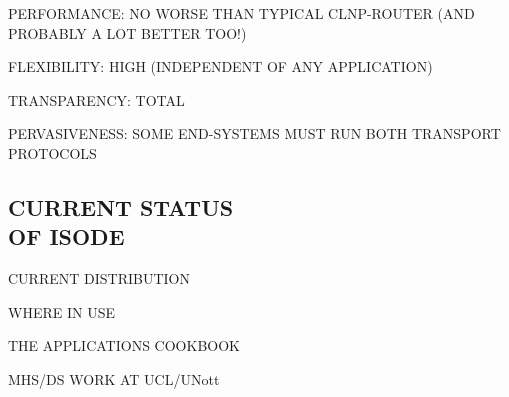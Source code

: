 

\begin{bwslide}

\begin{nrtc}
\item	PERFORMANCE: NO WORSE THAN TYPICAL CLNP-ROUTER (AND PROBABLY A LOT
	BETTER TOO!)

\item	FLEXIBILITY: HIGH (INDEPENDENT OF ANY APPLICATION)

\item	TRANSPARENCY: TOTAL

\item	PERVASIVENESS: SOME END-SYSTEMS MUST RUN BOTH TRANSPORT PROTOCOLS
\end{nrtc}
\end{bwslide}


\begin{bwslide}
\part	{CURRENT STATUS\\ OF ISODE}\bf

\begin{nrtc}
\item	CURRENT DISTRIBUTION

\item	WHERE IN USE

\item	THE APPLICATIONS COOKBOOK

\item	MHS/DS WORK AT UCL/UNott
\end{nrtc}
\end{bwslide}



